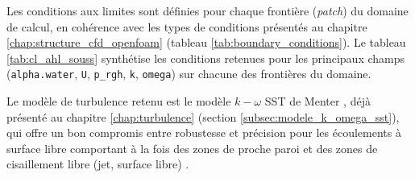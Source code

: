 Les conditions aux limites sont définies pour chaque frontière (\textit{patch}) du domaine de calcul, en cohérence avec les types de conditions présentés au chapitre \ref{chap:structure_cfd_openfoam} (tableau \ref{tab:boundary_conditions}). Le tableau \ref{tab:cl_ahl_souss} synthétise les conditions retenues pour les principaux champs (\texttt{alpha.water}, \texttt{U}, \texttt{p\_rgh}, \texttt{k}, \texttt{omega}) sur chacune des frontières du domaine.

\begin{table}[H]
    \centering
    \caption{Conditions aux limites retenues pour le cas Ahl Souss}
    \label{tab:cl_ahl_souss}
\end{table}

Le modèle de turbulence retenu est le modèle $k-\omega$ SST de Menter \cite{menter1994two}, déjà présenté au chapitre \ref{chap:turbulence} (section \ref{subsec:modele_k_omega_sst}), qui offre un bon compromis entre robustesse et précision pour les écoulements à surface libre comportant à la fois des zones de proche paroi et des zones de cisaillement libre (jet, surface libre) \cite{moukalled2016finite}.

